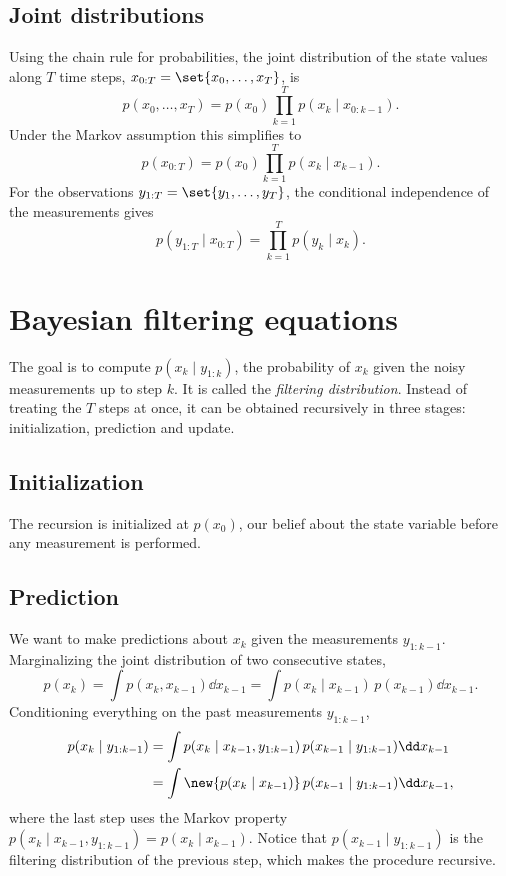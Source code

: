 \subsection{Joint distributions}
Using the chain rule for probabilities, the joint distribution of the state values along $T$ time steps, $x_{0:T} = \set{x_0,\dots,x_T}$, is
\begin{equation}
  p(x_0,\dots,x_T) = p(x_0)\prod_{k=1}^{T} p(x_k \mid x_{0:k-1}).
\end{equation}
Under the Markov assumption this simplifies to
\begin{equation}
  p(x_{0:T}) = p(x_0)\prod_{k=1}^{T} p(x_k \mid x_{k-1}).
\end{equation}
For the observations $y_{1:T} = \set{y_1,\dots,y_T}$, the conditional independence of the measurements gives
\begin{equation}
  p(y_{1:T} \mid x_{0:T}) = \prod_{k=1}^{T} p(y_k \mid x_k).
\end{equation}

\section{Bayesian filtering equations}
The goal is to compute $p(x_k \mid y_{1:k})$, the probability of $x_k$ given the noisy measurements up to step $k$. It is called the \emph{filtering distribution}. Instead of treating the $T$ steps at once, it can be obtained recursively in three stages: initialization, prediction and update.

\subsection{Initialization}
The recursion is initialized at $p(x_0)$, our belief about the state variable before any measurement is performed.

\subsection{Prediction}
We want to make predictions about $x_k$ given the measurements $y_{1:k-1}$. Marginalizing the joint distribution of two consecutive states,
\begin{equation}
  p(x_k) = \int p(x_k, x_{k-1}) \dd x_{k-1} = \int p(x_k \mid x_{k-1})\, p(x_{k-1}) \dd x_{k-1}.
\end{equation}
Conditioning everything on the past measurements $y_{1:k-1}$,
\begin{equation}
  \begin{aligned}
  p(x_k \mid y_{1:k-1}) &= \int p(x_k \mid x_{k-1}, y_{1:k-1})\, p(x_{k-1} \mid y_{1:k-1}) \dd x_{k-1} \\
  &= \int \new{p(x_k \mid x_{k-1})}\, p(x_{k-1} \mid y_{1:k-1}) \dd x_{k-1},
  \end{aligned}\label{eq:pred}
\end{equation}
where the last step uses the Markov property $p(x_k \mid x_{k-1}, y_{1:k-1}) = p(x_k \mid x_{k-1})$. Notice that $p(x_{k-1} \mid y_{1:k-1})$ is the filtering distribution of the previous step, which makes the procedure recursive.

